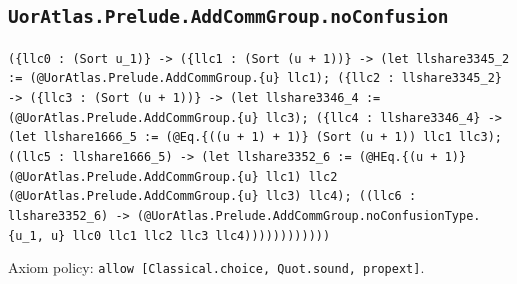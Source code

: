 \documentclass[11pt]{article}
\begin{document}
\subsection*{\texttt{UorAtlas.Prelude.AddCommGroup.noConfusion}}
\noindent\texttt{(\{llc0 : (Sort u\_1)\} -> (\{llc1 : (Sort (u + 1))\} -> (let llshare3345\_2 := (@UorAtlas.Prelude.AddCommGroup.\{u\} llc1); (\{llc2 : llshare3345\_2\} -> (\{llc3 : (Sort (u + 1))\} -> (let llshare3346\_4 := (@UorAtlas.Prelude.AddCommGroup.\{u\} llc3); (\{llc4 : llshare3346\_4\} -> (let llshare1666\_5 := (@Eq.\{((u + 1) + 1)\} (Sort (u + 1)) llc1 llc3); ((llc5 : llshare1666\_5) -> (let llshare3352\_6 := (@HEq.\{(u + 1)\} (@UorAtlas.Prelude.AddCommGroup.\{u\} llc1) llc2 (@UorAtlas.Prelude.AddCommGroup.\{u\} llc3) llc4); ((llc6 : llshare3352\_6) -> (@UorAtlas.Prelude.AddCommGroup.noConfusionType.\{u\_1, u\} llc0 llc1 llc2 llc3 llc4))))))))))))}\par
\noindent Axiom policy: \texttt{allow [Classical.choice, Quot.sound, propext]}.\par
\end{document}
